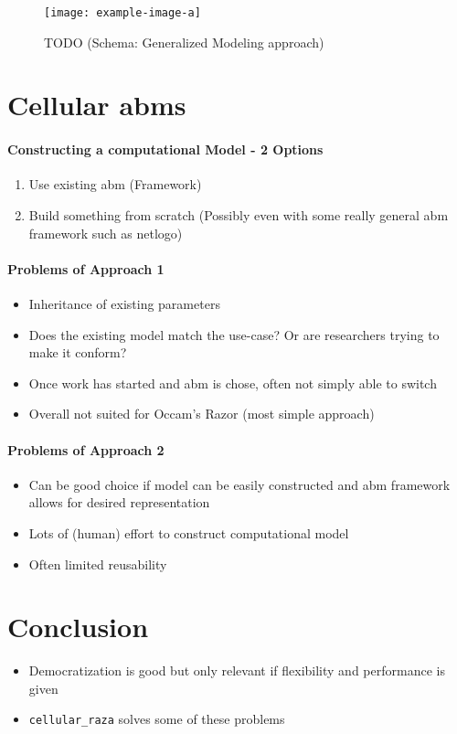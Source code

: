 \documentclass{article}
\begin{document}
\begin{figure}[H]
    \centering
    \texttt{[image: example-image-a]}
    \caption{TODO (Schema: Generalized Modeling approach)}
\end{figure}

\section{Cellular \aclp{abm}}

\paragraph{Constructing a computational Model - 2 Options}
\begin{enumerate}
    \item Use existing \ac{abm} (Framework)
    \item Build something from scratch (Possibly even with some really general \ac{abm}
        framework such as netlogo)
\end{enumerate}

\paragraph{Problems of Approach 1}
\begin{itemize}
    \item Inheritance of existing parameters
    \item Does the existing model match the use-case? Or are researchers trying to make it conform?
    \item Once work has started and \ac{abm} is chose, often not simply able to switch
    \item Overall not suited for Occam's Razor (most simple approach)
\end{itemize}

\paragraph{Problems of Approach 2}
\begin{itemize}
    \item Can be good choice if model can be easily constructed and \ac{abm} framework allows for
        desired representation
    \item Lots of (human) effort to construct computational model
    \item Often limited reusability
\end{itemize}

\section{Conclusion}
\begin{itemize}
    \item Democratization is good but only relevant if flexibility and performance is given \cite{Johnson2025}
    \item \cite{Pleyer2025} \texttt{cellular\_raza} solves some of these problems
\end{itemize}

\onecolumn


\end{document}
